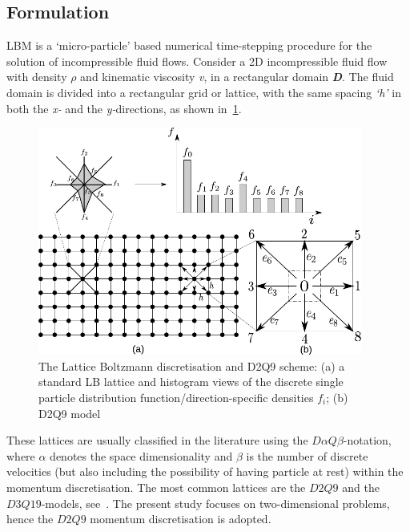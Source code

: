 \subsection{Formulation}

LBM is a `micro-particle' based numerical 
time-stepping procedure for the solution of incompressible 
fluid flows. Consider a 2D incompressible fluid flow with 
density $\rho$ and kinematic viscosity \textit{v}, in a 
rectangular domain \textit{\textbf{D}}. The fluid domain is 
divided into a rectangular grid or lattice, with the same 
spacing \textit{`h'} in both the \textit{x-} and the 
\textit{y-}directions, as shown in~\cref{fig:D2Q9}. 

\begin{figure}[htpb]
	\centering
	\includegraphics[width=0.95\textwidth]{D2Q9}
	\caption[The Lattice Boltzmann discretisation and D2Q9 scheme]{The Lattice 
	Boltzmann discretisation and D2Q9 scheme: (a) a standard LB lattice and 
	histogram views of the discrete single particle distribution 
	function/direction-specific densities $f_i$; (b) D2Q9 model}
	\label{fig:D2Q9}
\end{figure}

These lattices are usually classified in the literature using 
the $\mathit{D}\alpha\mathit{Q}\beta$-notation, where $\alpha$ 
denotes the space dimensionality and $\beta$ is the number of 
discrete velocities (but also including the possibility of 
having particle at rest) within the momentum discretisation. 
The most common lattices are the $\mathit{D2Q9}$ and the 
$\mathit{D3Q19}$-models, see~\citet{He1997}. The present study 
focuses on two-dimensional problems, hence the $\mathit{D2Q9}$ 
momentum discretisation is adopted.

